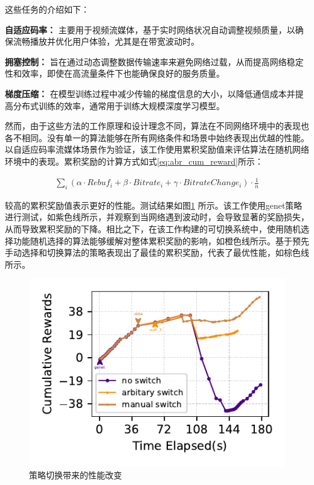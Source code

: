 

这些任务的介绍如下：

\textbf{自适应码率：} 主要用于视频流媒体，基于实时网络状况自动调整视频质量，以确保流畅播放并优化用户体验，尤其是在带宽波动时。

\textbf{拥塞控制：} 旨在通过动态调整数据传输速率来避免网络过载，从而提高网络稳定性和效率，即使在高流量条件下也能确保良好的服务质量。

\textbf{梯度压缩：} 在模型训练过程中减少传输的梯度信息的大小，以降低通信成本并提高分布式训练的效率，通常用于训练大规模深度学习模型。

然而，由于这些方法的工作原理和设计理念不同，算法在不同网络环境中的表现也各不相同。没有单一的算法能够在所有网络条件和场景中始终表现出优越的性能。以自适应码率流媒体场景作为验证，该工作使用累积奖励值来评估算法在随机网络环境中的表现。累积奖励的计算方式如式\eqref{eq:abr_cum_reward}所示：

\begin{equation}
\begin{aligned}
    \sum_i(\alpha \cdot Rebuf_i + \beta \cdot Bitrate_i + \gamma \cdot BitrateChange_i) \cdot \frac{1}{n}
\end{aligned}
\label{eq:abr_cum_reward}
\end{equation}

较高的累积奖励值表示更好的性能。测试结果如图\ref{fig_manual_switch} 所示。该工作使用genet策略进行测试，如紫色线所示，并观察到当网络遇到波动时，会导致显著的奖励损失，从而导致累积奖励的下降。相比之下，在该工作构建的可切换系统中，使用随机选择功能随机选择的算法能够缓解对整体累积奖励的影响，如橙色线所示。基于预先手动选择和切换算法的策略表现出了最佳的累积奖励，代表了最优性能，如棕色线所示。

\begin{figure} [h!]
\centering
\includegraphics[width=0.5\linewidth]{figures/chap04/manual_switch_validation.pdf} 
\caption{策略切换带来的性能改变}
\label{fig_manual_switch}
\end{figure}



